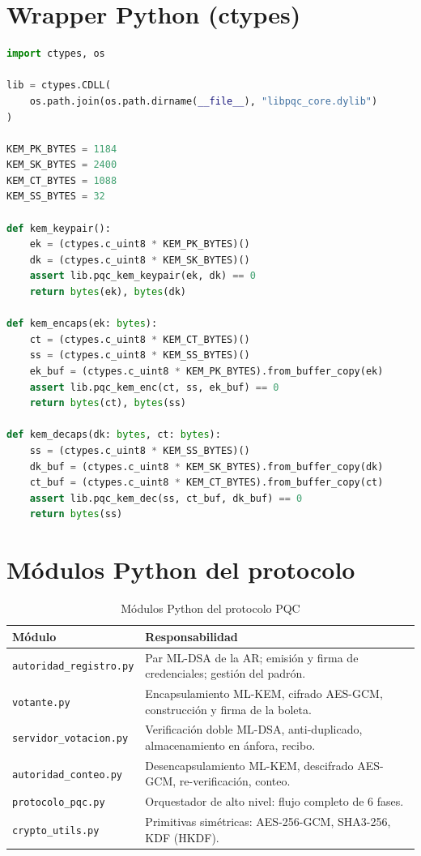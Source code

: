 \documentclass[12pt,a4paper,twoside,openright]{book}
\theoremstyle{plain}
\theoremstyle{definition}
\theoremstyle{remark}
\begin{document}
\section{Wrapper Python (ctypes)}

\begin{lstlisting}[language=Python, caption={Fragmento de pqc\_wrapper.py}]
import ctypes, os

lib = ctypes.CDLL(
    os.path.join(os.path.dirname(__file__), "libpqc_core.dylib")
)

KEM_PK_BYTES = 1184
KEM_SK_BYTES = 2400
KEM_CT_BYTES = 1088
KEM_SS_BYTES = 32

def kem_keypair():
    ek = (ctypes.c_uint8 * KEM_PK_BYTES)()
    dk = (ctypes.c_uint8 * KEM_SK_BYTES)()
    assert lib.pqc_kem_keypair(ek, dk) == 0
    return bytes(ek), bytes(dk)

def kem_encaps(ek: bytes):
    ct = (ctypes.c_uint8 * KEM_CT_BYTES)()
    ss = (ctypes.c_uint8 * KEM_SS_BYTES)()
    ek_buf = (ctypes.c_uint8 * KEM_PK_BYTES).from_buffer_copy(ek)
    assert lib.pqc_kem_enc(ct, ss, ek_buf) == 0
    return bytes(ct), bytes(ss)

def kem_decaps(dk: bytes, ct: bytes):
    ss = (ctypes.c_uint8 * KEM_SS_BYTES)()
    dk_buf = (ctypes.c_uint8 * KEM_SK_BYTES).from_buffer_copy(dk)
    ct_buf = (ctypes.c_uint8 * KEM_CT_BYTES).from_buffer_copy(ct)
    assert lib.pqc_kem_dec(ss, ct_buf, dk_buf) == 0
    return bytes(ss)
\end{lstlisting}

\section{M\'odulos Python del protocolo}

\begin{table}[H]
\centering
\caption{M\'odulos Python del protocolo PQC}
\label{tab:modulos}
\begin{tabular}{lp{9cm}}
\toprule
\textbf{M\'odulo} & \textbf{Responsabilidad} \\
\midrule
\texttt{autoridad\_registro.py} &
  Par ML-DSA de la AR; emisi\'on y firma de credenciales; gesti\'on del padr\'on. \\
\texttt{votante.py} &
  Encapsulamiento ML-KEM, cifrado AES-GCM, construcci\'on y firma de la boleta. \\
\texttt{servidor\_votacion.py} &
  Verificaci\'on doble ML-DSA, anti-duplicado, almacenamiento en \'anfora, recibo. \\
\texttt{autoridad\_conteo.py} &
  Desencapsulamiento ML-KEM, descifrado AES-GCM, re-verificaci\'on, conteo. \\
\texttt{protocolo\_pqc.py} &
  Orquestador de alto nivel: flujo completo de 6 fases. \\
\texttt{crypto\_utils.py} &
  Primitivas sim\'etricas: AES-256-GCM, SHA3-256, KDF (HKDF). \\
\bottomrule
\end{tabular}
\end{table}
\end{document}
